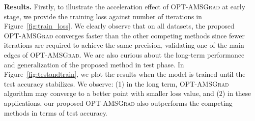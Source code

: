 \documentclass[wcp]{jmlr}
\begin{document}
\textbf{Results.} 
Firstly, to illustrate the acceleration effect of \textsc{OPT-AMSGrad} at early stage, we provide the training loss against number of iterations in Figure~\ref{fig:train_loss}. 
We clearly observe that on all datasets, the proposed \textsc{OPT-AMSGrad} converges faster than the other competing methods since fewer iterations are required to achieve the same precision, validating one of the main edges of \textsc{OPT-AMSGrad}.
We are also curious about the long-term performance and generalization of the proposed method in test phase.
In Figure~\ref{fig:testandtrain}, we plot the results when the model is trained until the test accuracy stabilizes. 
We observe: \textsf{(1)} in the long term, \textsc{OPT-AMSGrad} algorithm may converge to a better point with smaller loss value, and \textsf{(2)} in these applications, our proposed \textsc{OPT-AMSGrad} also outperforms the competing methods in terms of test accuracy. 
\end{document}
